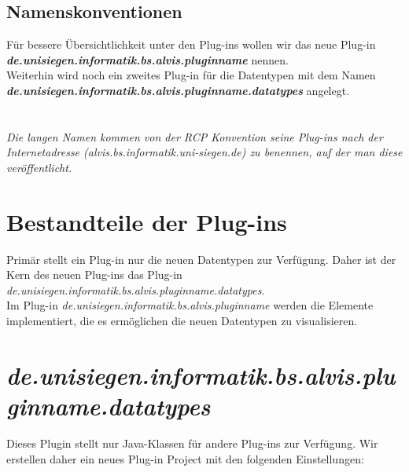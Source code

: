 \documentclass[10pt,a4paper]{article}
\begin{document}
\subsection{Namenskonventionen}
Für bessere Übersichtlichkeit unter den Plug-ins wollen wir das neue Plug-in\\
\emph{\textbf{de.unisiegen.informatik.bs.alvis.pluginname}} nennen. \\
Weiterhin wird noch ein zweites Plug-in für die Datentypen mit dem Namen \\
\emph{\textbf{de.unisiegen.informatik.bs.alvis.pluginname.datatypes}} angelegt.\\
\\ \\
\emph{Die langen Namen kommen von der RCP Konvention seine Plug-ins nach der Internetadresse (alvis.bs.informatik.uni-siegen.de) zu benennen, auf der man diese veröffentlicht.}
\newpage

\section{Bestandteile der Plug-ins}
Primär stellt ein Plug-in nur die neuen Datentypen zur Verfügung. Daher ist der Kern des neuen Plug-ins das Plug-in \emph{de.unisiegen.informatik.bs.alvis.pluginname.datatypes}. \\
Im Plug-in \emph{de.unisiegen.informatik.bs.alvis.pluginname} werden die Elemente implementiert, die es ermöglichen die neuen Datentypen zu visualisieren.
\section{\emph{de.unisiegen.informatik.bs.alvis.pluginname.datatypes}}
Dieses Plugin stellt nur Java-Klassen für andere Plug-ins zur Verfügung. Wir erstellen daher ein neues Plug-in Project mit den folgenden Einstellungen: \\
\end{document}
